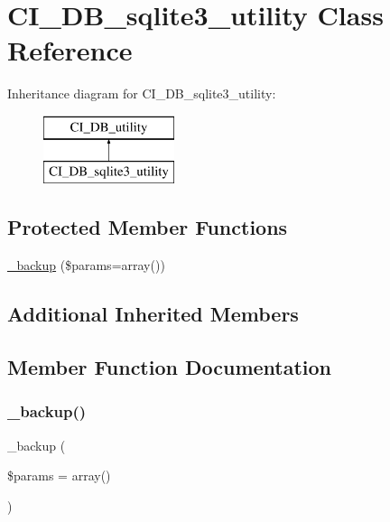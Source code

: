 \hypertarget{class_c_i___d_b__sqlite3__utility}{}\section{C\+I\+\_\+\+D\+B\+\_\+sqlite3\+\_\+utility Class Reference}
\label{class_c_i___d_b__sqlite3__utility}
Inheritance diagram for C\+I\+\_\+\+D\+B\+\_\+sqlite3\+\_\+utility\+:\begin{figure}[H]
\begin{center}
\leavevmode
\includegraphics[height=2.000000cm]{class_c_i___d_b__sqlite3__utility}
\end{center}
\end{figure}
\subsection*{Protected Member Functions}
\begin{DoxyCompactItemize}
\item 
\mbox{\hyperlink{class_c_i___d_b__sqlite3__utility_a30f3053d2c82e7562349924363507afa}{\+\_\+backup}} (\$params=array())
\end{DoxyCompactItemize}
\subsection*{Additional Inherited Members}


\subsection{Member Function Documentation}
\mbox{\label{class_c_i___d_b__sqlite3__utility_a30f3053d2c82e7562349924363507afa}} 
\subsubsection{\texorpdfstring{\+\_\+backup()}{\_backup()}}
{\footnotesize\ttfamily \+\_\+backup (\begin{DoxyParamCaption}\item[{}]{\$params = {\ttfamily array()} }\end{DoxyParamCaption})\hspace{0.3cm}{\ttfamily [protected]}}

